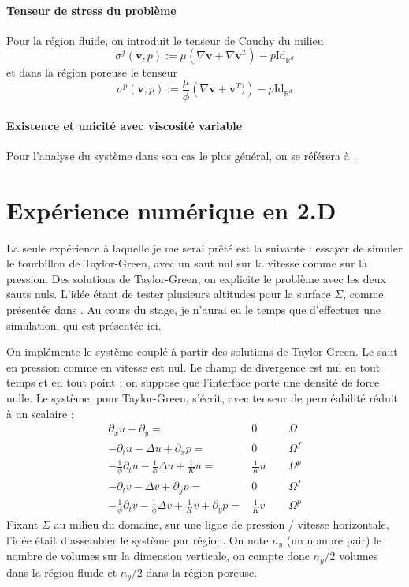 \paragraph{Tenseur de stress du problème} Pour la région fluide, on introduit le tenseur de Cauchy du milieu $$ \sigma^f(\mathbf{v}, p) := \mu \left( \nabla \mathbf{v} + \nabla \mathbf{v}^T \right) - p \text{Id}_{\mathbb{R}^d} $$ et dans la région poreuse le tenseur $$ \sigma^p(\mathbf{v}, p) := \frac{\mu}{\phi} \left( \nabla \mathbf{v} + \mathbf{v}^T) \right) - p \text{Id}_{\mathbb{R}^d} $$

\paragraph{Existence et unicité avec viscosité variable} Pour l'analyse du système dans son cas le plus général, on se référera à \cite{angot:hal-01635289}.

\section{Expérience numérique en 2.D}

La seule expérience à laquelle je me serai prêté est la suivante : essayer de simuler le tourbillon de Taylor-Green, avec un saut nul sur la vitesse comme sur la pression. Des solutions de Taylor-Green, on explicite le problème avec les deux sauts nuls. L'idée étant de tester plusieurs altitudes pour la surface $\Sigma$, comme présentée dans \cite{angot:hal-03172378}. Au cours du stage, je n'aurai eu le temps que d'effectuer une simulation, qui est présentée ici.

On implémente le système couplé à partir des solutions de Taylor-Green. Le saut en pression comme en vitesse est nul. Le champ de divergence est nul en tout temps et en tout point ; on suppose que l'interface porte une densité de force nulle. Le système, pour Taylor-Green, s'écrit, avec tenseur de perméabilité réduit à un scalaire :
\begin{align*}
    \partial_x u + \partial_y = & 0 \hspace{15pt} & \Omega \\
    -\partial_t u - \Delta u + \partial_x p = & 0 \hspace{15pt} &  \Omega^f \\
    -\frac{1}{\phi}\partial_t u - \frac{1}{\phi} \Delta u + \frac{1}{K} u = & \frac{1}{K} u \hspace{15pt} & \Omega^p \\
    -\partial_t v - \Delta v + \partial_y p = & 0 \hspace{15pt} & \Omega^f \\
    -\frac{1}{\phi}\partial_t v - \frac{1}{\phi} \Delta v + \frac{1}{K} v + \partial_y p = & \frac{1}{K} v \hspace{15pt} & \Omega^p
\end{align*}
Fixant $\Sigma$ au milieu du domaine, sur une ligne de pression / vitesse horizontale, l'idée était d'assembler le système par région. On note $n_y$ (un nombre pair) le nombre de volumes sur la dimension verticale, on compte donc $n_y/2$ volumes dans la région fluide et $n_y/2$ dans la région poreuse.

